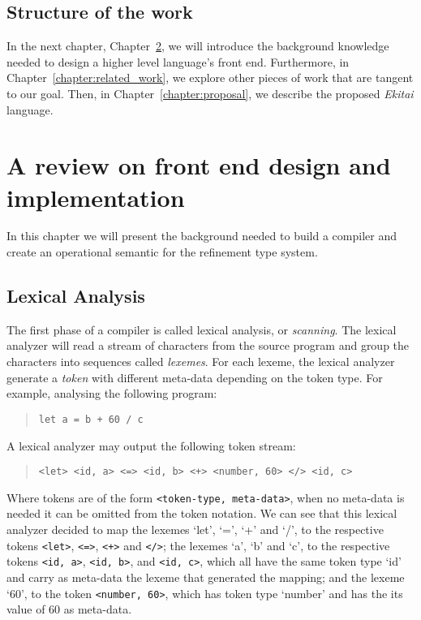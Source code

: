 \documentclass[
    oneside,
    english,
    embeddedlogo,
    noabntexcite
]{ufsc-thesis-rn46-2019}
\begin{document}
\section{Structure of the work}

In the next chapter, Chapter~\ref{chapter:background}, we will introduce the background knowledge needed to design a higher level language's front end. Furthermore, in Chapter~\ref{chapter:related_work}, we explore other pieces of work that are tangent to our goal. Then, in Chapter~\ref{chapter:proposal}, we describe the proposed \textit{Ekitai} language.

\chapter{A review on front end design and implementation}\label{chapter:background}

In this chapter we will present the background needed to build a compiler and create an operational semantic for the refinement type system.

\section{Lexical Analysis}

The first phase of a compiler is called lexical analysis, or \textit{scanning}.
The lexical analyzer will read a stream of characters from the source program and group the characters into sequences called \textit{lexemes}.
For each lexeme, the lexical analyzer generate a \textit{token} with different meta-data depending on the token type.
For example, analysing the following program:
\begin{quote}
    \begin{verbatim}
let a = b + 60 / c
\end{verbatim}
\end{quote}
A lexical analyzer may output the following token stream:
\begin{quote}\label{figure:introduction_token_stream}
    \begin{verbatim}
<let> <id, a> <=> <id, b> <+> <number, 60> </> <id, c>
\end{verbatim}
\end{quote}
Where tokens are of the form \verb+<token-type, meta-data>+, when no meta-data is needed it can be omitted from the token notation.
We can see that this lexical analyzer decided to map the lexemes `let', `=', `+' and `/', to the respective tokens \verb+<let>+, \verb+<=>+, \verb-<+>- and \verb+</>+;
the lexemes `a', `b' and `c', to the respective tokens \verb+<id, a>+, \verb+<id, b>+, and \verb+<id, c>+, which all have the same token type `id' and carry as meta-data the lexeme that generated the mapping; and the lexeme `60', to the token \verb+<number, 60>+, which has token type `number' and has the its value of $60$ as meta-data.
\end{document}

